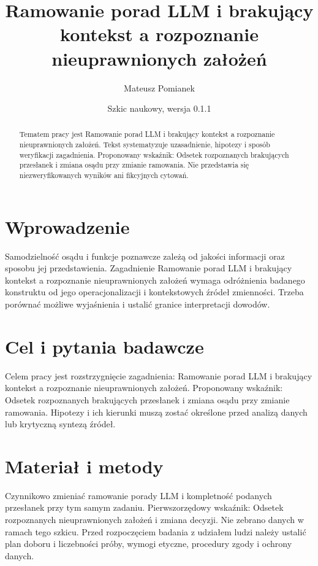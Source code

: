 \documentclass[11pt,a4paper]{article}
\title{Ramowanie porad LLM i brakujący kontekst a rozpoznanie nieuprawnionych założeń}
\author{Mateusz Pomianek}
\date{Szkic naukowy, wersja 0.1.1}
\begin{document}
\maketitle

\begin{abstract}

Tematem pracy jest Ramowanie porad LLM i brakujący kontekst a rozpoznanie nieuprawnionych założeń. Tekst systematyzuje uzasadnienie, hipotezy i sposób weryfikacji zagadnienia. Proponowany wskaźnik: Odsetek rozpoznanych brakujących przesłanek i zmiana osądu przy zmianie ramowania. Nie przedstawia się niezweryfikowanych wyników ani fikcyjnych cytowań.

\end{abstract}

\section{Wprowadzenie}

Samodzielność osądu i funkcje poznawcze zależą od jakości informacji oraz sposobu jej przedstawienia. Zagadnienie Ramowanie porad LLM i brakujący kontekst a rozpoznanie nieuprawnionych założeń wymaga odróżnienia badanego konstruktu od jego operacjonalizacji i kontekstowych źródeł zmienności. Trzeba porównać możliwe wyjaśnienia i ustalić granice interpretacji dowodów.

\section{Cel i pytania badawcze}

Celem pracy jest rozstrzygnięcie zagadnienia: Ramowanie porad LLM i brakujący kontekst a rozpoznanie nieuprawnionych założeń. Proponowany wskaźnik: Odsetek rozpoznanych brakujących przesłanek i zmiana osądu przy zmianie ramowania. Hipotezy i ich kierunki muszą zostać określone przed analizą danych lub krytyczną syntezą źródeł.

\section{Materiał i metody}

Czynnikowo zmieniać ramowanie porady LLM i kompletność podanych przesłanek przy tym samym zadaniu. Pierwszorzędowy wskaźnik: Odsetek rozpoznanych nieuprawnionych założeń i zmiana decyzji. Nie zebrano danych w ramach tego szkicu. Przed rozpoczęciem badania z udziałem ludzi należy ustalić plan doboru i liczebności próby, wymogi etyczne, procedury zgody i ochrony danych.
\end{document}
